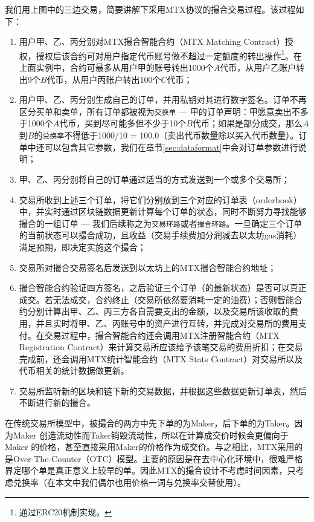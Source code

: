 \documentclass[UTF8,nofonts]{ctexart}
\begin{document}
我们用上图中的三边交易，简要讲解下采用MTX协议的撮合交易过程。该过程如下：

\begin{enumerate}
	\item 用户甲、乙、丙分别对MTX撮合智能合约（MTX Matching Contract）授权，授权后该合约可对用户指定代币账号做不超过一定额度的转出操作\footnote{通过ERC20机制实现。}。在上面实例中，合约可最多从用户甲的账号转出1000个$A$代币，从用户乙账户转出9个$B$代币，从用户丙账户转出100个$C$代币；
	\item 用户甲、乙、丙分别生成自己的订单，并用私钥对其进行数字签名。订单不再区分买单和卖单，所有订单都被视为\texttt{交换单} --- 甲的订单声明：甲愿意卖出不多于1000个$A$代币，买到尽可能多但不少于10个$B$代币；如果是部分成交，那么$A$到$B$的\texttt{兑换率}不得低于1000/10 = 100.0（卖出代币数量除以买入代币数量）。订单中还可以包含其它参数，我们在章节\ref{sec:dataformat}中会对订单参数进行说明；
	\item 甲、乙、丙分别将自己的订单通过适当的方式发送到一个或多个交易所；
	\item 交易所收到上述三个订单，将它们分别放到三个对应的订单表（orderbook）中，并实时通过区块链数据更新计算每个订单的状态，同时不断努力寻找能够撮合的一组订单 --- 我们后续称之为\texttt{交易环路}或者\texttt{撮合环路}。一旦确定三个订单的当前状态可以撮合成功，且收益（交易手续费加分润减去以太坊gas消耗）满足预期，即决定实施这个撮合；
	\item 交易所对撮合交易签名后发送到以太坊上的MTX撮合智能合约地址；
	\item 撮合智能合约验证四方签名，之后验证三个订单（的最新状态）是否可以真正成交。若无法成交，合约终止（交易所依然要消耗一定的油费）；否则智能合约分别计算出甲、乙、丙三方各自需要支出的金额，以及交易所该收取的费用，并且实时将甲、乙、丙账号中的资产进行互转，并完成对交易所的费用支付。在交易过程中，撮合智能合约还会调用MTX注册智能合约（MTX Registration Contract）来计算交易所应该给予该笔交易的费用折扣；在交易完成前，还会调用MTX统计智能合约（MTX Stats Contract）对交易所以及代币相关的统计数据做更新。
	\item 交易所监听新的区块和链下新的交易数据，并根据这些数据更新订单表，然后不断进行新的撮合。
\end{enumerate}

在传统交易所模型中，被撮合的两方中先下单的为Maker，后下单的为Taker。因为Maker 创造流动性而Taker销毁流动性，所以在计算成交价时候会更偏向于Maker 的价格，甚至直接采用Maker的价格作为成交价。与之相比，MTX采用的是Over-The-Counter（OTC）模型。主要的原因是在去中心化环境中，很难严格界定哪个单是真正意义上较早的单。因此MTX的撮合设计不考虑时间因素，只考虑兑换率（在本文中我们偶尔也用价格一词与兑换率交替使用）。
\end{document}
